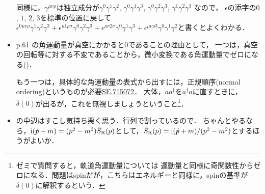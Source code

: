 \begin{itemize}
		同様に，$\gamma^{\mu\nu\rho}$は独立成分が$\gamma^{0}\gamma^{1}\gamma^{2}$, $\gamma^{0}\gamma^{1}\gamma^{3}$, $\gamma^{0}\gamma^{2}\gamma^{3}$, $\gamma^{1}\gamma^{2}\gamma^{3}$
		なので，
		$\epsilon$の添字の$0$, $1$, $2$, $3$を標準の位置に戻して$\epsilon^{0\mu\nu\rho}\gamma^{1}\gamma^{2}\gamma^{3} + \epsilon^{\mu1\rho\sigma}\gamma^{0}\gamma^{2}\gamma^{3} + \epsilon^{\mu\nu2\sigma}\gamma^{0}\gamma^{1}\gamma^{3} + \epsilon^{\mu\nu\rho3}\gamma^{0}\gamma^{1}\gamma^{2}$と書くとよくわかる．



	\item p.61 の角運動量が真空にかかると$0$であることの理由として，
		一つは，真空の回転等に対する不変であることから，微小変換である角運動量でゼロになる(\cite[p.323]{Sakamoto2014})．

		もう一つは，具体的な角運動量の表式から出すには，正規順序(normal ordering)というものが必要\href{https://physics.stackexchange.com/a/715148}{SE.715072}．
		大体，$aa^{\dag}$を$a^{\dag}a$に直すときに，$\delta(0)$が出るが，これを無視しましょうということ\footnote{ゼミで質問すると，軌道角運動量については
		運動量と同様に奇関数性からゼロになる．問題はspinだが，こちらはエネルギーと同様に，spinの基準が$\delta(0)$に解釈するという．}．
	\item {}の中辺はすこし気持ち悪く思う．行列で割っているので．
		ちゃんとやるなら，$\mathrm{i} (p\!\!\!/ + m) = (p^2 - m^2) \tilde{S}_{\text{R}}(p)$として，$\tilde{S}_{\text{R}}(p) = \mathrm{i}(p\!\!\!/ + m)/(p^2-m^2) $とするほうがよいか．
\end{itemize}
